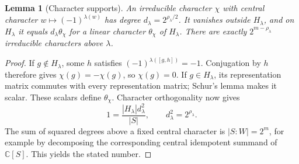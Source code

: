 \documentclass[11pt,a4paper]{amsart}
\newtheorem{lemma}[thm]{Lemma}
\theoremstyle{definition}
\theoremstyle{remark}
\numberwithin{equation}{section}
\begin{document}
\begin{lemma}[Character supports]\label{lem:class2-support-new}
An irreducible character $\chi$ with central character
$w\mapsto(-1)^{\lambda(w)}$ has degree
$d_\lambda=2^{\rho_\lambda/2}$. It vanishes outside $H_\lambda$, and
on $H_\lambda$ it equals $d_\lambda\theta_\chi$ for a linear character
$\theta_\chi$ of $H_\lambda$. There are exactly
$2^{m-\rho_\lambda}$ irreducible characters above $\lambda$.
\end{lemma}
\begin{proof}
If $g\notin H_\lambda$, some $h$ satisfies
$(-1)^{\lambda([g,h])}=-1$. Conjugation by $h$ therefore gives
$\chi(g)=-\chi(g)$, so $\chi(g)=0$. If $g\in H_\lambda$, its
representation matrix commutes with every representation matrix;
Schur's lemma makes it scalar. These scalars define
$\theta_\chi$. Character orthogonality now gives
\[
 1=\frac{|H_\lambda|d_\lambda^2}{|S|},
 \qquad d_\lambda^2=2^{\rho_\lambda}.
\]
The sum of squared degrees above a fixed central character is
$|S:W|=2^m$, for example by decomposing the corresponding central
idempotent summand of $\mathbb C[S]$. This yields the stated number.
\end{proof}
\end{document}
